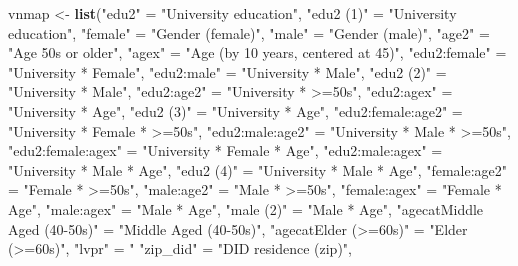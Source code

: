 \documentclass[
]{article}
\newenvironment{Shaded}{\begin{snugshade}}{\end{snugshade}}
\newcommand{\KeywordTok}[1]{\textcolor[rgb]{0.13,0.29,0.53}{\textbf{#1}}}
\newcommand{\NormalTok}[1]{#1}
\newcommand{\StringTok}[1]{\textcolor[rgb]{0.31,0.60,0.02}{#1}}
\begin{document}
\begin{Shaded}
\begin{Highlighting}[]
\NormalTok{vnmap <-}\StringTok{ }\KeywordTok{list}\NormalTok{(}\StringTok{"edu2"}\NormalTok{ =}\StringTok{ "University education"}\NormalTok{,}
              \StringTok{"edu2 (1)"}\NormalTok{ =}\StringTok{ "University education"}\NormalTok{,}
              \StringTok{"female"}\NormalTok{ =}\StringTok{ "Gender (female)"}\NormalTok{,}
              \StringTok{"male"}\NormalTok{ =}\StringTok{ "Gender (male)"}\NormalTok{,}
              \StringTok{"age2"}\NormalTok{ =}\StringTok{ "Age 50s or older"}\NormalTok{,}
              \StringTok{"agex"}\NormalTok{ =}\StringTok{ "Age (by 10 years, centered at 45)"}\NormalTok{,}
              \StringTok{"edu2:female"}\NormalTok{ =}\StringTok{ "University * Female"}\NormalTok{,}
              \StringTok{"edu2:male"}\NormalTok{ =}\StringTok{ "University * Male"}\NormalTok{,}
              \StringTok{"edu2 (2)"}\NormalTok{ =}\StringTok{ "University * Male"}\NormalTok{,}
              \StringTok{"edu2:age2"}\NormalTok{ =}\StringTok{ "University * >=50s"}\NormalTok{,}
              \StringTok{"edu2:agex"}\NormalTok{ =}\StringTok{ "University * Age"}\NormalTok{,}
              \StringTok{"edu2 (3)"}\NormalTok{ =}\StringTok{ "University * Age"}\NormalTok{,}
              \StringTok{"edu2:female:age2"}\NormalTok{ =}\StringTok{ "University * Female * >=50s"}\NormalTok{,}
              \StringTok{"edu2:male:age2"}\NormalTok{ =}\StringTok{ "University * Male * >=50s"}\NormalTok{,}
              \StringTok{"edu2:female:agex"}\NormalTok{ =}\StringTok{ "University * Female * Age"}\NormalTok{,}
              \StringTok{"edu2:male:agex"}\NormalTok{ =}\StringTok{ "University * Male * Age"}\NormalTok{,}
              \StringTok{"edu2 (4)"}\NormalTok{ =}\StringTok{ "University * Male * Age"}\NormalTok{,}
              \StringTok{"female:age2"}\NormalTok{ =}\StringTok{ "Female * >=50s"}\NormalTok{,}
              \StringTok{"male:age2"}\NormalTok{ =}\StringTok{ "Male * >=50s"}\NormalTok{,}
              \StringTok{"female:agex"}\NormalTok{ =}\StringTok{ "Female * Age"}\NormalTok{,}
              \StringTok{"male:agex"}\NormalTok{ =}\StringTok{ "Male * Age"}\NormalTok{,}
              \StringTok{"male (2)"}\NormalTok{ =}\StringTok{ "Male * Age"}\NormalTok{,}
              \StringTok{"agecatMiddle Aged (40-50s)"}\NormalTok{ =}\StringTok{ "Middle Aged (40-50s)"}\NormalTok{,}
              \StringTok{"agecatElder (>=60s)"}\NormalTok{ =}\StringTok{ "Elder (>=60s)"}\NormalTok{,}
              \StringTok{"lvpr"}\NormalTok{ =}\StringTok{ "% of Life Residing Locally (zip)"}\NormalTok{,}
              \StringTok{"zip_did"}\NormalTok{ =}\StringTok{ "DID residence (zip)"}\NormalTok{,}
}
\end{Highlighting}
\end{Shaded}
\end{document}
